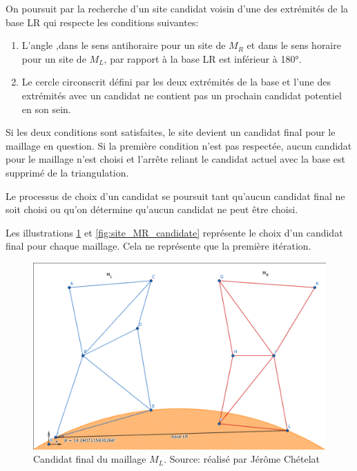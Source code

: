 On poursuit par la recherche d'un site candidat voisin d'une des extrémités de la base LR qui respecte les conditions suivantes:

\begin{enumerate}
    \item L'angle ,dans le sens antihoraire pour un site de $M_R$ et dans le sens horaire pour un site de $M_L$, par rapport à la base LR est inférieur à 180°.
    \item Le cercle circonscrit défini par les deux extrémités de la base et l'une des extrémités avec un candidat ne contient pas un prochain candidat potentiel en son sein.
\end{enumerate}

Si les deux conditions sont satisfaites, le site devient un candidat final pour le maillage en question.
Si la première condition n'est pas respectée, aucun candidat pour le maillage n'est choisi et l'arrête reliant le candidat actuel avec la base est supprimé de la triangulation.

Le processus de choix d'un candidat se poursuit tant qu'aucun candidat final ne soit choisi ou qu'on détermine qu'aucun candidat ne peut être choisi.

Les illustrations \ref{fig:site_ML_candidate} et \ref{fig:site_MR_candidate} représente le choix d'un candidat final pour chaque maillage. Cela ne représente que la première itération.
\begin{figure}[htbp!]
    \centering
    \includegraphics[width=0.8\linewidth]{figures/site_ML.png}
    \caption{Candidat final du maillage $M_L$. Source: réalisé par Jérôme Chételat}
    \label{fig:site_ML_candidate}
\end{figure}

